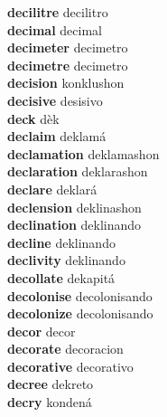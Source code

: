 \textbf{decilitre } decilitro \\
\textbf{decimal } decimal \\
\textbf{decimeter } decimetro \\
\textbf{decimetre } decimetro \\
\textbf{decision } konklushon \\
\textbf{decisive } desisivo \\
\textbf{deck } dèk \\
\textbf{declaim } deklamá \\
\textbf{declamation } deklamashon \\
\textbf{declaration } deklarashon \\
\textbf{declare } deklará \\
\textbf{declension } deklinashon \\
\textbf{declination } deklinando \\
\textbf{decline } deklinando \\
\textbf{declivity } deklinando \\
\textbf{decollate } dekapitá \\
\textbf{decolonise } decolonisando \\
\textbf{decolonize } decolonisando \\
\textbf{decor } decor \\
\textbf{decorate } decoracion \\
\textbf{decorative } decorativo \\
\textbf{decree } dekreto \\
\textbf{decry } kondená \\
